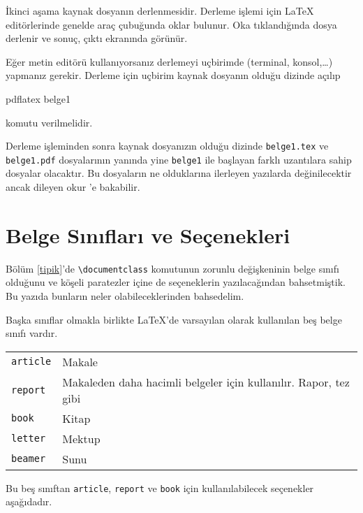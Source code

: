\documentclass[
  10pt,
]{scrbook}
\newenvironment{Shaded}{\begin{snugshade}}{\end{snugshade}}
\newcommand{\NormalTok}[1]{#1}
\begin{document}
İkinci aşama kaynak dosyanın derlenmesidir. Derleme işlemi için LaTeX
editörlerinde genelde araç çubuğunda oklar bulunur. Oka tıklandığında
dosya derlenir ve sonuç, çıktı ekranında görünür.

Eğer metin editörü kullanıyorsanız derlemeyi uçbirimde (terminal,
konsol,\ldots) yapmanız gerekir. Derleme için uçbirim kaynak dosyanın
olduğu dizinde açılıp

\begin{Shaded}
\begin{Highlighting}[]
\NormalTok{pdflatex belge1}
\end{Highlighting}
\end{Shaded}

komutu verilmelidir.

Derleme işleminden sonra kaynak dosyanızın olduğu dizinde \texttt{belge1.tex}
ve \texttt{belge1.pdf} dosyalarının yanında yine \texttt{belge1} ile başlayan farklı
uzantılara sahip dosyalar olacaktır. Bu dosyaların ne olduklarına
ilerleyen yazılarda değinilecektir ancak dileyen okur \citep[s. 13-14]{Oetiker}'e bakabilir.

\hypertarget{belgesinifi}{%
\section{Belge Sınıfları ve Seçenekleri}\label{belgesinifi}}

Bölüm \ref{tipik}'de \texttt{\textbackslash{}documentclass} komutunun zorunlu değişkeninin belge
sınıfı olduğunu ve köşeli paratezler içine de seçeneklerin
yazılacağından bahsetmiştik. Bu yazıda bunların neler olabileceklerinden
bahsedelim.

Başka sınıflar olmakla birlikte LaTeX'de varsayılan olarak kullanılan
beş belge sınıfı vardır.

\begin{longtable}[]{@{}ll@{}}
\toprule
\endhead
\texttt{article} & Makale \\
\texttt{report} & Makaleden daha hacimli belgeler için kullanılır. Rapor, tez gibi \\
\texttt{book} & Kitap \\
\texttt{letter} & Mektup \\
\texttt{beamer} & Sunu \\
\bottomrule
\end{longtable}

Bu beş sınıftan \texttt{article}, \texttt{report} ve \texttt{book} için kullanılabilecek
seçenekler aşağıdadır.
\end{document}
